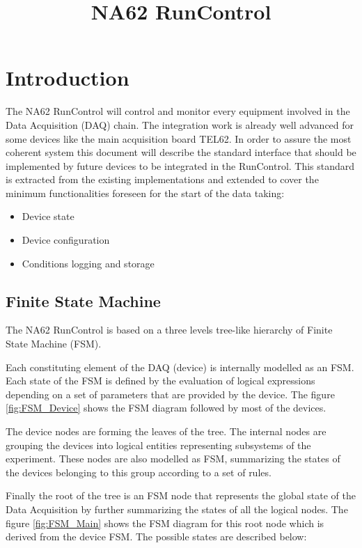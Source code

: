 \documentclass[a4paper]{article}
\title{NA62 RunControl}
\begin{document}
\maketitle

\linenumbers

\section{Introduction}
The NA62 RunControl will control and monitor every equipment involved in the Data Acquisition
(DAQ) chain. The integration work is already well advanced for some devices like the main
acquisition board TEL62\cite{biblio:TEL62}. In order to assure the most coherent system this
document will describe the standard interface that should be implemented by future devices to be
integrated in the RunControl. This standard is extracted from the existing implementations and
extended to cover the minimum functionalities foreseen for the start of the data taking:
\begin{itemize}
	\item Device state
	\item Device configuration
	\item Conditions logging and storage
\end{itemize} 

\subsection{Finite State Machine}
The NA62 RunControl is based on a three levels tree-like hierarchy of Finite State Machine (FSM).

Each constituting element of the DAQ (device) is internally modelled as an FSM. Each state of the
FSM is defined by the evaluation of logical expressions depending on a set of parameters that are
provided by the device. The figure \ref{fig:FSM_Device} shows the FSM diagram followed by most of
the devices.

The device nodes are forming the leaves of the tree. The internal nodes are grouping the devices
into logical entities representing subsystems of the experiment. These nodes are also modelled as
FSM, summarizing the states of the devices belonging to this group according to a set of rules.

Finally the root of the tree is an FSM node that represents the global state of the Data Acquisition
by further summarizing the states of all the logical nodes. The figure \ref{fig:FSM_Main} shows the
FSM diagram for this root node which is derived from the device FSM. The possible states are
described below:
\end{document}
